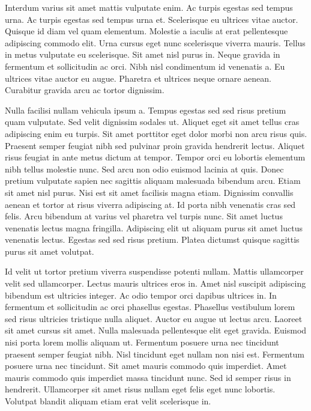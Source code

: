 \documentclass[titlepage,oneside]{book}
\begin{document}
Interdum varius sit amet mattis vulputate enim. Ac turpis egestas sed tempus urna. Ac turpis egestas sed tempus urna et. Scelerisque eu ultrices vitae auctor. Quisque id diam vel quam elementum. Molestie a iaculis at erat pellentesque adipiscing commodo elit. Urna cursus eget nunc scelerisque viverra mauris. Tellus in metus vulputate eu scelerisque. Sit amet nisl purus in. Neque gravida in fermentum et sollicitudin ac orci. Nibh nisl condimentum id venenatis a. Eu ultrices vitae auctor eu augue. Pharetra et ultrices neque ornare aenean. Curabitur gravida arcu ac tortor dignissim.

Nulla facilisi nullam vehicula ipsum a. Tempus egestas sed sed risus pretium quam vulputate. Sed velit dignissim sodales ut. Aliquet eget sit amet tellus cras adipiscing enim eu turpis. Sit amet porttitor eget dolor morbi non arcu risus quis. Praesent semper feugiat nibh sed pulvinar proin gravida hendrerit lectus. Aliquet risus feugiat in ante metus dictum at tempor. Tempor orci eu lobortis elementum nibh tellus molestie nunc. Sed arcu non odio euismod lacinia at quis. Donec pretium vulputate sapien nec sagittis aliquam malesuada bibendum arcu. Etiam sit amet nisl purus. Nisi est sit amet facilisis magna etiam. Dignissim convallis aenean et tortor at risus viverra adipiscing at. Id porta nibh venenatis cras sed felis. Arcu bibendum at varius vel pharetra vel turpis nunc. Sit amet luctus venenatis lectus magna fringilla. Adipiscing elit ut aliquam purus sit amet luctus venenatis lectus. Egestas sed sed risus pretium. Platea dictumst quisque sagittis purus sit amet volutpat.

Id velit ut tortor pretium viverra suspendisse potenti nullam. Mattis ullamcorper velit sed ullamcorper. Lectus mauris ultrices eros in. Amet nisl suscipit adipiscing bibendum est ultricies integer. Ac odio tempor orci dapibus ultrices in. In fermentum et sollicitudin ac orci phasellus egestas. Phasellus vestibulum lorem sed risus ultricies tristique nulla aliquet. Auctor eu augue ut lectus arcu. Laoreet sit amet cursus sit amet. Nulla malesuada pellentesque elit eget gravida. Euismod nisi porta lorem mollis aliquam ut. Fermentum posuere urna nec tincidunt praesent semper feugiat nibh. Nisl tincidunt eget nullam non nisi est. Fermentum posuere urna nec tincidunt. Sit amet mauris commodo quis imperdiet. Amet mauris commodo quis imperdiet massa tincidunt nunc. Sed id semper risus in hendrerit. Ullamcorper sit amet risus nullam eget felis eget nunc lobortis. Volutpat blandit aliquam etiam erat velit scelerisque in.
\end{document}
